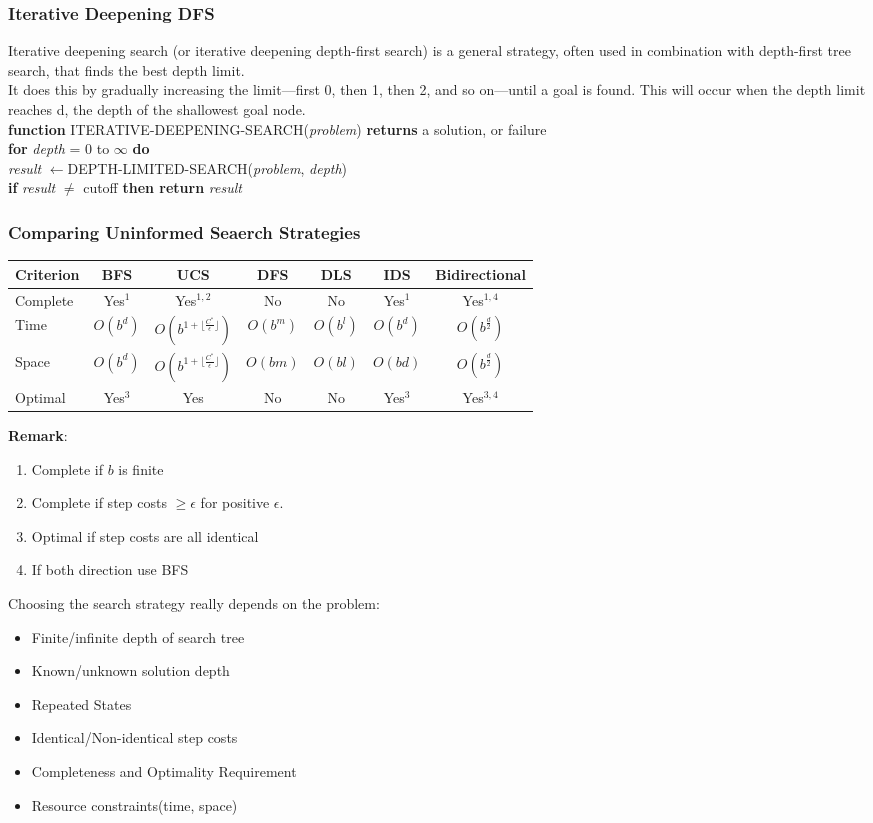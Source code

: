 \documentclass[12pt]{article}
\newcommand{\ind}{\hspace*{15pt}}
\theoremstyle{definition}
\begin{document}
\subsubsection{Iterative Deepening DFS}
Iterative deepening search (or iterative deepening depth-first search) is a general strategy, often used in combination with depth-first tree search, that finds the best depth limit. \\
It does this by gradually increasing the limit—first 0, then 1, then 2, and so on—until a goal is found. This will occur when the depth limit reaches d, the depth of the shallowest goal node.\\
\textbf{function} \textsc{ITERATIVE-DEEPENING-SEARCH}(\textit{problem}) \textbf{returns} a solution, or failure\\
\ind \textbf{for} \textit{depth} = 0 to $\infty$ \textbf{do}\\
\ind \ind \textit{result} $\leftarrow$\textsc{DEPTH-LIMITED-SEARCH}(\textit{problem}, \textit{depth})\\
\ind \ind \textbf{if} \textit{result} $\neq$ cutoff \textbf{then return} \textit{result}
\subsubsection{Comparing Uninformed Seaerch Strategies}
\begin{table}[H]
\centering
\begin{tabular}{|l|c|c|c|c|c|c|}
\hline
Criterion&BFS&UCS&DFS&DLS&IDS&Bidirectional\\\hline
Complete&Yes$^1$&Yes$^{1,2}$&No&No&Yes$^1$&Yes$^{1,4}$\\\hline
Time&$O(b^d)$&$O(b^{1+\lfloor \frac{C^\ast}{\epsilon}\rfloor})$&$O(b^m)$&$O(b^l)$&$O(b^d)$&$O(b^{\frac{d}{2}})$\\\hline
Space&$O(b^d)$&$O(b^{1+\lfloor \frac{C^\ast}{\epsilon}\rfloor})$&$O(bm)$&$O(bl)$&$O(bd)$&$O(b^\frac{d}{2})$\\\hline
Optimal&Yes$^3$&Yes&No&No&Yes$^3$&Yes$^{3,4}$\\\hline
\end{tabular}
\end{table}
\textbf{Remark}:
\begin{enumerate}
	\item Complete if $b$ is finite
	\item Complete if step costs $\geq \epsilon$ for positive $\epsilon$.
	\item Optimal if step costs are all identical
	\item If both direction use BFS
\end{enumerate}
Choosing the search strategy really depends on the problem:
\begin{itemize}
	\item Finite/infinite depth of search tree
	\item Known/unknown solution depth
	\item Repeated States
	\item Identical/Non-identical step costs
	\item Completeness and Optimality Requirement
	\item Resource constraints(time, space)
\end{itemize}
\clearpage
\end{document}

